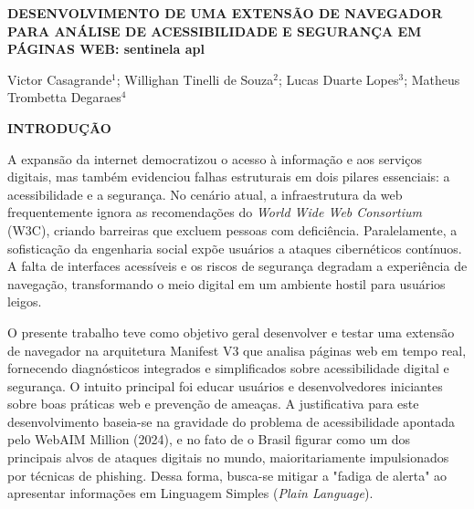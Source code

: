 \documentclass[12pt, a4paper]{article}
\newcommand{\titlesection}[1]{
    \vspace{1.5em}
    \noindent\textbf{\MakeUppercase{#1}}
    \vspace{1em}\par
}
\begin{document}
\onehalfspacing

\begin{center}
    \textbf{DESENVOLVIMENTO DE UMA EXTENSÃO DE NAVEGADOR PARA ANÁLISE DE ACESSIBILIDADE E SEGURANÇA EM PÁGINAS WEB: sentinela apl}
    
    \vspace{1.5em}
    Victor Casagrande$^{1}$; Willighan Tinelli de Souza$^{2}$; Lucas Duarte Lopes$^{3}$; Matheus Trombetta Degaraes$^{4}$
\end{center}


\titlesection{INTRODUÇÃO}

A expansão da internet democratizou o acesso à informação e aos serviços digitais, mas também evidenciou falhas estruturais em dois pilares essenciais: a acessibilidade e a segurança. No cenário atual, a infraestrutura da web frequentemente ignora as recomendações do \textit{World Wide Web Consortium} (W3C), criando barreiras que excluem pessoas com deficiência. Paralelamente, a sofisticação da engenharia social expõe usuários a ataques cibernéticos contínuos. A falta de interfaces acessíveis e os riscos de segurança degradam a experiência de navegação, transformando o meio digital em um ambiente hostil para usuários leigos.

O presente trabalho teve como objetivo geral desenvolver e testar uma extensão de navegador na arquitetura Manifest V3 que analisa páginas web em tempo real, fornecendo diagnósticos integrados e simplificados sobre acessibilidade digital e segurança. O intuito principal foi educar usuários e desenvolvedores iniciantes sobre boas práticas web e prevenção de ameaças. A justificativa para este desenvolvimento baseia-se na gravidade do problema de acessibilidade apontada pelo WebAIM Million (2024), e no fato de o Brasil figurar como um dos principais alvos de ataques digitais no mundo, maioritariamente impulsionados por técnicas de phishing. Dessa forma, busca-se mitigar a "fadiga de alerta" ao apresentar informações em Linguagem Simples (\textit{Plain Language}).
\end{document}
